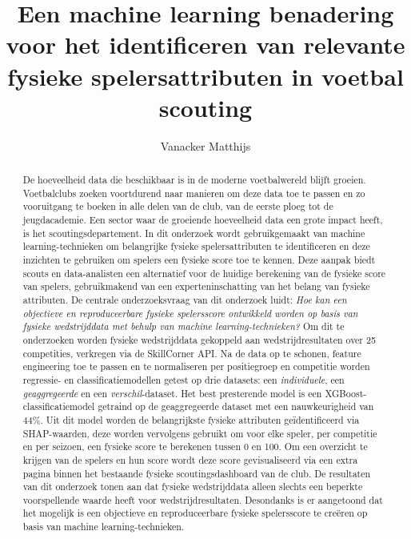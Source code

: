\documentclass[a0,portrait]{hogent-poster}
\title{Een machine learning benadering voor het identificeren van relevante fysieke spelersattributen in voetbal scouting}
\author{Vanacker Matthijs}
\begin{document}
\maketitle

\begin{abstract}
De hoeveelheid data die beschikbaar is in de moderne voetbalwereld blijft groeien. Voetbalclubs zoeken voortdurend naar manieren om deze data toe te passen en zo vooruitgang te boeken in alle delen van de club, van de eerste ploeg tot de jeugdacademie. Een sector waar de groeiende hoeveelheid data een grote impact heeft, is het scoutingsdepartement. 
In dit onderzoek wordt gebruikgemaakt van machine learning-technieken om belangrijke fysieke spelersattributen te identificeren en deze inzichten te gebruiken om spelers een fysieke score toe te kennen. Deze aanpak biedt scouts en data-analisten een alternatief voor de huidige berekening van de fysieke score van spelers, gebruikmakend van een experteninschatting van het belang van fysieke attributen. 
De centrale onderzoeksvraag van dit onderzoek luidt: \emph{Hoe kan een objectieve en reproduceerbare fysieke spelersscore ontwikkeld worden op basis van fysieke wedstrijddata met behulp van machine learning-technieken?} 
Om dit te onderzoeken worden fysieke wedstrijddata gekoppeld aan wedstrijdresultaten over 25 competities, verkregen via de SkillCorner API. Na de data op te schonen, feature engineering toe te passen en te normaliseren per positiegroep en competitie worden regressie- en classificatiemodellen getest op drie datasets: een \emph{individuele}, een \emph{geaggregeerde} en een \emph{verschil}-dataset. Het best presterende model is een XGBoost-classificatiemodel getraind op de geaggregeerde dataset met een nauwkeurigheid van 44\%. Uit dit model worden de belangrijkste fysieke attributen geïdentificeerd via SHAP-waarden, deze worden vervolgens gebruikt om voor elke speler, per competitie en per seizoen, een fysieke score te berekenen tussen 0 en 100. Om een overzicht te krijgen van de spelers en hun score wordt deze score gevisualiseerd via een extra pagina binnen het bestaande fysieke scoutingsdashboard van de club.
De resultaten van dit onderzoek tonen aan dat fysieke wedstrijddata alleen slechts een beperkte voorspellende waarde heeft voor wedstrijdresultaten. Desondanks is er aangetoond dat het mogelijk is een objectieve en reproduceerbare fysieke spelersscore te creëren op basis van machine learning-technieken. 

\end{abstract}
\end{document}
